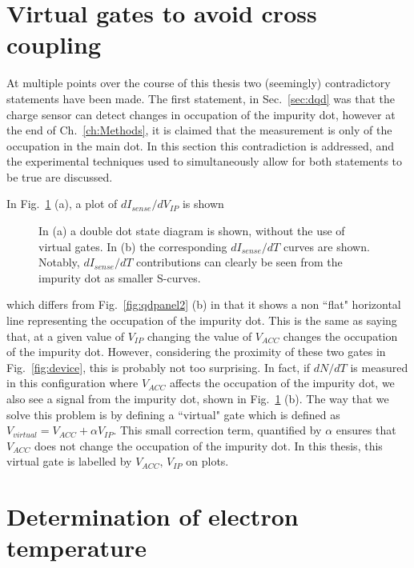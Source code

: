 \section{Virtual gates to avoid cross coupling}
\label{sec:artifacts}

At multiple points over the course of this thesis two (seemingly) contradictory statements have been made. The first statement, in Sec.~\ref{sec:dqd} was that the charge sensor can detect changes in occupation of the impurity dot, however at the end of Ch.~\ref{ch:Methods}, it is claimed that the measurement is only of the occupation in the main dot. In this section this contradiction is addressed, and the experimental techniques used to simultaneously allow for both statements to be true are discussed.

In Fig.~\ref{fig:dndt_artifact} (a), a plot of $dI_{sense}/dV_{IP}$ is shown
\begin{figure}[h]
\centering
{}
\caption{In (a) a double dot state diagram is shown, without the use of virtual gates. In (b) the corresponding $dI_{sense}/dT$ curves are shown. Notably, $dI_{sense}/dT$ contributions can clearly be seen from the impurity dot as smaller S-curves.}
\label{fig:dndt_artifact}       
\end{figure}
which differs from Fig.~\ref{fig:qdpanel2} (b) in that it shows a non ``flat" horizontal line representing the occupation of the impurity dot. This is the same as saying that, at a given value of $V_{IP}$ changing the value of $V_{ACC}$ changes the occupation of the impurity dot. However, considering the proximity of these two gates in Fig.~\ref{fig:device}, this is probably not too surprising. In fact, if $dN/dT$ is measured in this configuration where $V_{ACC}$ affects the occupation of the impurity dot, we also see a signal from the impurity dot, shown in Fig.~\ref{fig:dndt_artifact} (b). The way that we solve this problem is by defining a ``virtual" gate which is defined as $V_{virtual} = V_{ACC} + \alpha V_{IP}$. This small correction term, quantified by $\alpha$ ensures that $V_{ACC}$ does not change the occupation of the impurity dot. In this thesis, this virtual gate is labelled by $V_{ACC}, \, V_{IP}$ on plots.


\section{Determination of electron temperature}
\label{sec:electrontemp}

